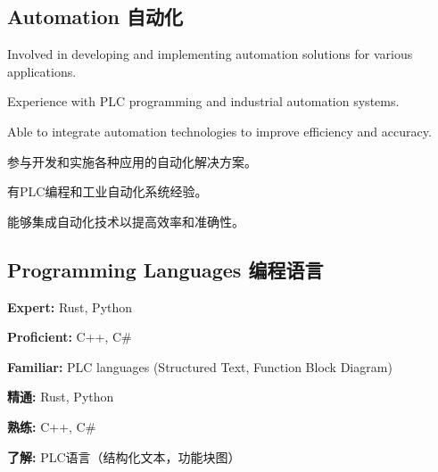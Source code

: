\documentclass[
]
{article}
\providecommand{\tightlist}{%
  \setlength{\itemsep}{0pt}\setlength{\parskip}{0pt}}
\renewenvironment{itemize}{
  \begin{list}{}{
    \setlength{\leftmargin}{1.5em}
  }
}{
  \end{list}
}
\begin{document}
\subsection{Automation \textbar{}
自动化}\label{automation-ux81eaux52a8ux5316}

\begin{itemize}
\tightlist
\item
  Involved in developing and implementing automation solutions for
  various applications.
\item
  Experience with PLC programming and industrial automation systems.
\item
  Able to integrate automation technologies to improve efficiency and
  accuracy.
\end{itemize}

\begin{figure*}

\begin{itemize}
\tightlist
\item
  参与开发和实施各种应用的自动化解决方案。
\item
  有PLC编程和工业自动化系统经验。
\item
  能够集成自动化技术以提高效率和准确性。
\end{itemize}

\end{figure*}%

\subsection{Programming Languages \textbar{}
编程语言}\label{programming-languages-ux7f16ux7a0bux8bedux8a00}

\begin{itemize}
\tightlist
\item
  \textbf{Expert:} Rust, Python
\item
  \textbf{Proficient:} C++, C\#
\item
  \textbf{Familiar:} PLC languages (Structured Text, Function Block
  Diagram)
\end{itemize}

\begin{figure*}

\begin{itemize}
\tightlist
\item
  \textbf{精通:} Rust, Python
\item
  \textbf{熟练:} C++, C\#
\item
  \textbf{了解:} PLC语言（结构化文本，功能块图）
\end{itemize}

\end{figure*}%
\end{document}
